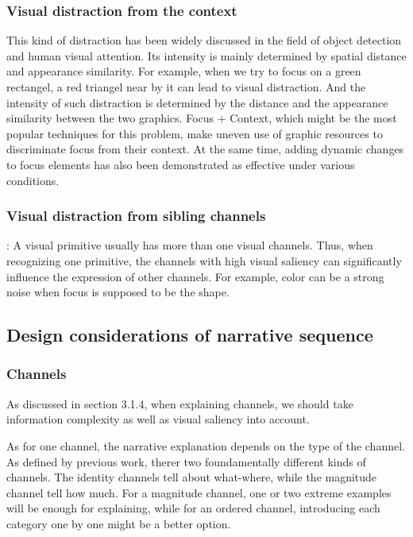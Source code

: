 \subsubsection{Visual distraction from the context}
This kind of distraction has been widely discussed in the field of object detection and human visual attention. \cite{nothdurft_salience_2000, standage_modelling_2005}Its intensity is mainly  determined by spatial distance and appearance similarity. \cite{wolfe_guided_1994}For example, when we try to focus on a green rectangel, a red triangel near by it can lead to visual distraction. And the intensity of such distraction is determined by the distance and the appearance similarity between the two graphics. Focus + Context, which might be the most popular techniques for this problem, make uneven use of graphic resources to discriminate focus from their context. At the same time, adding dynamic changes to focus elements has also been demonstrated as effective under various conditions\cite{waldner_attractive_2014}. 

\subsubsection{Visual distraction from sibling channels}: A visual primitive usually has more than one visual channels. Thus, when recognizing one primitive, the channels with high visual saliency can significantly influence the expression of other channels. For example, color can be a strong noise when focus is supposed to be the shape.

\subsection{Design considerations of narrative sequence}

\subsubsection{Channels}
As discussed in section 3.1.4, when explaining channels, we should take information complexity as well as visual saliency into account. 

As for one channel, the narrative explanation depends on the type of the channel. As defined by previous work, therer two foundamentally different kinds of channels. The identity channels tell about what-where, while the magnitude channel tell how much. For a magnitude channel, one or two extreme examples will be enough for explaining, while for an ordered channel, introducing each category one by one might be a better option.

